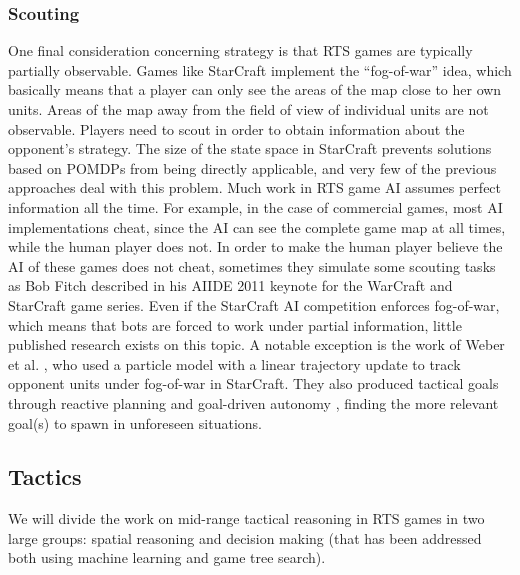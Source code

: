 \documentclass{llncs}
\begin{document}
\subsubsection{Scouting}
One  final consideration  concerning strategy  is that  RTS games  are
typically  partially observable.  Games like  StarCraft implement  the
``fog-of-war'' idea, which basically means  that a player can only see
the areas  of the map close  to her own  units. Areas of the  map away
from the field of view of individual units are not observable. Players
need  to scout  in order  to obtain  information about  the opponent's
strategy. The size of the  state space in StarCraft prevents solutions
based on  POMDPs from being directly  applicable, and very few  of the
previous approaches deal  with this problem. Much work in  RTS game AI
assumes perfect information all the time.  For example, in the case of
commercial games, most AI implementations  cheat, since the AI can see
the  complete game  map  at all  times, while  the  human player  does
not. In order to  make the human player believe the  AI of these games
does not  cheat, sometimes  they simulate some  scouting tasks  as Bob
Fitch  described  in his  AIIDE  2011  keynote  for the  WarCraft  and
StarCraft game series.  Even if the StarCraft  AI competition enforces
fog-of-war, which  means that  bots are forced  to work  under partial
information, little published research exists on this topic. A notable
exception is the work of Weber  et al. \cite{WeberAIIDE11}, who used a
particle model with a linear trajectory update to track opponent units
under  fog-of-war  in StarCraft.  They  also  produced tactical  goals
through     reactive     planning     and     goal-driven     autonomy
\cite{WeberCig10,Weber10}, finding the more  relevant goal(s) to spawn
in unforeseen situations.


\subsection{Tactics}

We will divide the work on mid-range tactical reasoning in RTS games in two
large groups: spatial reasoning and decision making (that has been addressed both using machine learning and game tree search).
\end{document}
